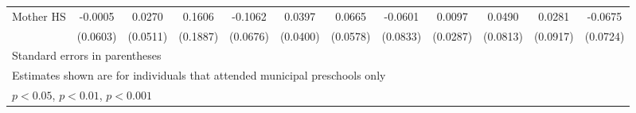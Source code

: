 \begin{table}[htbp]
\begin{tabular}{l*{11}{c}}
\addlinespace
Mother HS   &     -0.0005         &      0.0270         &      0.1606         &     -0.1062         &      0.0397         &      0.0665         &     -0.0601         &      0.0097         &      0.0490         &      0.0281         &     -0.0675         \\
            &    (0.0603)         &    (0.0511)         &    (0.1887)         &    (0.0676)         &    (0.0400)         &    (0.0578)         &    (0.0833)         &    (0.0287)         &    (0.0813)         &    (0.0917)         &    (0.0724)         \\
\bottomrule
\multicolumn{12}{l}{\footnotesize Standard errors in parentheses}\\
\multicolumn{12}{l}{\footnotesize Estimates shown are for individuals that attended municipal preschools only}\\
\multicolumn{12}{l}{\footnotesize \sym{*} \(p<0.05\), \sym{**} \(p<0.01\), \sym{***} \(p<0.001\)}\\
\end{tabular}
\end{table}
